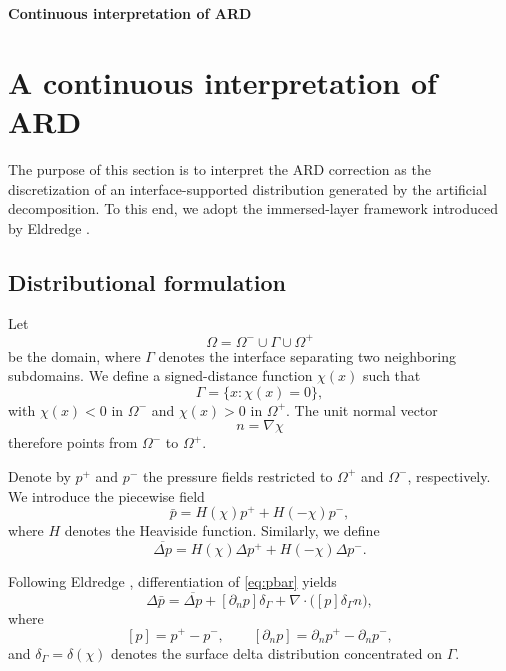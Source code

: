 \documentclass[a4paper,11pt]{article}
\begin{document}
\begin{center}
    {\Large\bfseries Continuous interpretation of ARD}
\end{center}

\vspace{0.8cm}

\section{A continuous interpretation of ARD}

The purpose of this section is to interpret the ARD correction as the
discretization of an interface-supported distribution generated by the
artificial decomposition. To this end, we adopt the immersed-layer framework
introduced by Eldredge \cite{Eldredge2021}.

\subsection{Distributional formulation}

Let
\[
\Omega=\Omega^-\cup\Gamma\cup\Omega^+
\]
be the domain, where $\Gamma$ denotes the interface separating two neighboring
subdomains. We define a signed-distance function $\chi(x)$ such that
\[
\Gamma=\{x:\chi(x)=0\},
\]
with $\chi(x)<0$ in $\Omega^-$ and $\chi(x)>0$ in $\Omega^+$. The unit normal
vector
\[
n=\nabla\chi
\]
therefore points from $\Omega^-$ to $\Omega^+$.

Denote by $p^+$ and $p^-$ the pressure fields restricted to $\Omega^+$ and
$\Omega^-$, respectively. We introduce the piecewise field
\begin{equation}
\bar p
=
H(\chi)p^+
+
H(-\chi)p^-,
\label{eq:pbar}
\end{equation}
where $H$ denotes the Heaviside function. Similarly, we define
\begin{equation}
\overline{\Delta p}
=
H(\chi)\Delta p^+
+
H(-\chi)\Delta p^-.
\label{eq:piecewise-laplacian}
\end{equation}

Following Eldredge \cite[Eq.~(4)]{Eldredge2021}, differentiation of
\eqref{eq:pbar} yields
\begin{equation}
\Delta\bar p
=
\overline{\Delta p}
+
[\partial_n p]\delta_\Gamma
+
\nabla\cdot
\big(
[p]\delta_\Gamma n
\big),
\label{eq:eldredge}
\end{equation}
where
\[
[p]=p^+-p^-,
\qquad
[\partial_n p]
=
\partial_n p^+
-
\partial_n p^-,
\]
and $\delta_\Gamma=\delta(\chi)$ denotes the surface delta distribution
concentrated on $\Gamma$.
\end{document}

